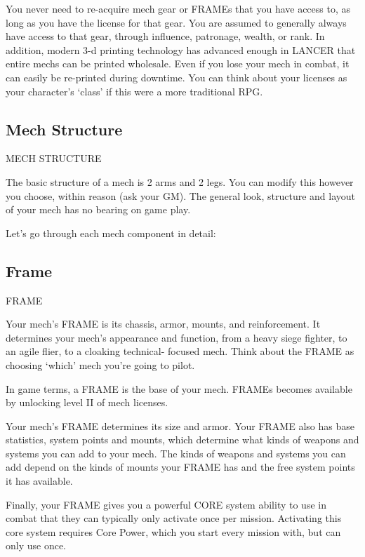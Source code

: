 You never need to re-acquire mech gear or FRAMEs that you have access to, as long as you  
have the license for that gear. You are assumed to generally always have access to that gear,  
through influence, patronage, wealth, or rank. In addition, modern 3-d printing technology has  
advanced enough in LANCER that entire mechs can be printed wholesale. Even if you lose your  
mech in combat, it can easily be re-printed during downtime. You can think about your licenses  
as your character’s ‘class’ if this were a more traditional RPG.
 
\subsection{Mech Structure}
                                        MECH STRUCTURE  

                                                                                                             


The basic structure of a mech is 2 arms and 2 legs. You can modify this however you choose,  
within reason (ask your GM). The general look, structure and layout of your mech has no  
bearing on game play.
 

Let’s go through each mech component in detail:
 
\subsection{Frame}
                                                 FRAME  

Your mech’s FRAME is its chassis, armor, mounts, and reinforcement. It determines your mech’s  
appearance and function, from a heavy siege fighter, to an agile flier, to a cloaking technical- 
focused mech. Think about the FRAME as choosing ‘which’ mech you’re going to pilot.
 

In game terms, a FRAME is the base of your mech. FRAMEs becomes available by unlocking  
level II of mech licenses. 
 

Your mech’s FRAME determines its size and armor. Your FRAME also has base statistics,  
system points and mounts, which determine what kinds of weapons and systems you can add  
to your mech. The kinds of weapons and systems you can add depend on the kinds of mounts  
your FRAME has and the free system points it has available.
 

Finally, your FRAME gives you a powerful CORE system ability to use in combat that they can  
typically only activate once per mission. Activating this core system requires Core Power, which  
you start every mission with, but can only use once.
 
